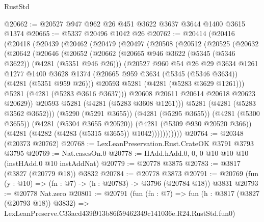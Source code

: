 \begin{lexlean}{RustStd}
\begin{coremodule}
@20662 := @20527 @947 @962 @26 @451 @3622 @3637 @3644 @1400 @3615 @1374
@20665 := @5337 @20496 @1042 @26
@20762 := @20414
    (@20416
      (@20418
        (@20439
          (@20462
            (@20479
              (@20497
                (@20508
                  (@20512
                    (@20525
                      (@20632
                        (@20642
                          (@20646
                            (@20652
                              (@20662
                                (@20665 @946 @3622 (@5345 (@5346 @3622)) (@4281 (@5351 @946 @26)))
                                (@20527
                                  @960
                                  @54
                                  @26
                                  @29
                                  @3634
                                  @1261
                                  @1277
                                  @1400
                                  @3628
                                  @1374
                                  (@20665 @959 @3634 (@5345 (@5346 @3634)) (@4281 (@5351 @959 @26)))
                                  @20593
                                  @5281
                                  (@4281 (@5283 @3629 @1261)))
                                @5281
                                (@4281 (@5283 @3616 @3637)))
                              @20608
                              @20611
                              @20614
                              @20618
                              @20623
                              @20629))
                          @20593
                          @5281
                          (@4281 (@5283 @3608 @1261)))
                        @5281
                        (@4281 (@5283 @3562 @3652)))
                      (@5290 (@5291 @3655))
                      (@4281 (@5295 @3655))
                      (@4281 (@5300 @3655))
                      (@4281 (@5304 @3655 @20520))
                      (@4281 (@5309 @930 @20520 @366))
                      (@4281 (@4282 (@4283 (@5315 @3655)) @1042)))))))))))
@20764 := @20348 (@20373 @20762)
@20768 := LexLeanPreservation.Rust.CrateOK @3791 @3793 @3795
@20769 := Nat.casesOn.{0}
@20778 := HAdd.hAdd.{0, 0, 0} @10 @10 @10 (instHAdd.{0} @10 instAddNat)
@20779 := @20778 @3875
@20783 := @3817 (@3827 (@20779 @18)) @3832
@20784 := @20778 @3873
@20791 := @20769 (fun (y : @10) => (fn : @7) -> (h : @20783) -> @3796 (@20784 @18)) @3831
@20793 := @20778 Nat.zero
@20801 := @20791
    (fun (fn : @7) =>
    fun (h : @3817 (@3827 (@20793 @18)) @3832) =>
    LexLeanPreserve.C33acd439f913b86f59462349c141036e.R24.RustStd.fun0)

\end{coremodule}
\end{lexlean}
